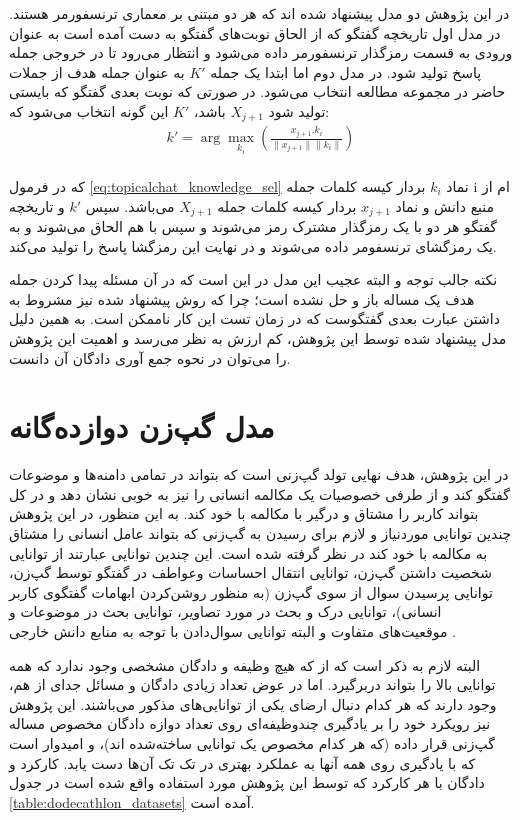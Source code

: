 در این پژوهش دو مدل پیشنهاد شده اند که هر دو مبتنی بر معماری ترنسفورمر هستند. در مدل اول تاریخچه گفتگو که از الحاق نوبت‌های گفتگو به دست آمده است به عنوان ورودی به قسمت رمزگذار ترنسفورمر داده می‌شود و انتظار می‌رود تا در خروجی جمله پاسخ تولید شود.
در مدل دوم اما ابتدا یک جمله 
$K'$ 
به عنوان جمله هدف از جملات حاضر در مجموعه مطالعه انتخاب می‌شود. در صورتی که نوبت‌ بعدی گفتگو که بایستی تولید شود 
$X_{j+1}$
باشد، 
$K'$
این گونه انتخاب می‌شود که:
\\
\begin{gather} \label{eq:topicalchat_knowledge_sel}
k' = \arg\max_{k_i}{
(\frac{x_{j+1}.k_i}{\lVert  x_{j+1}  \rVert 
	\lVert  k_i  \rVert})
}
\end{gather}
\\
که در فرمول 
\ref{eq:topicalchat_knowledge_sel}
نماد‌
$k_i$
بردار کیسه کلمات جمله i ام از منبع دانش و نماد
$x_{j+1}$
بردار کیسه کلمات جمله 
$X_{j+1}$
می‌باشد.
سپس 
$k'$
و تاریخچه گفتگو هر دو با یک رمزگذار مشترک رمز می‌شوند و سپس با هم الحاق می‌شوند و به یک رمز‌گشای ترنسفومر داده می‌شوند و در نهایت این رمزگشا پاسخ را تولید می‌کند. 

نکته جالب توجه و البته عجیب این مدل در این است که در آن مسئله پیدا کردن جمله هدف یک مساله باز و حل نشده است؛ چرا که روش پیشنهاد شده نیز مشروط به داشتن عبارت بعدی گفتگوست که در زمان تست این کار ناممکن است. به همین دلیل مدل پیشنهاد شده توسط این پژوهش، کم ارزش به نظر می‌رسد و اهمیت این پژوهش را می‌توان در نحوه جمع آوری دادگان آن دانست.


\section{مدل گپ‌زن دوازده‌گانه}
در این پژوهش، هدف نهایی تولد گپ‌زنی است که بتواند در تمامی دامنه‌ها و موضوعات گفتگو کند و از طرفی خصوصیات یک مکالمه انسانی را نیز به خوبی نشان دهد و در کل بتواند کاربر را مشتاق و درگیر با مکالمه با خود کند. به این منظور، ‌در این پژوهش چندین توانایی موردنیاز و لازم برای رسیدن به گپ‌زنی که بتواند عامل انسانی را مشتاق به مکالمه با خود کند در نظر گرفته شده است. این چندین توانایی عبارتند از توانایی شخصیت داشتن گپ‌زن، توانایی انتقال احساسات وعواطف  در گفتگو توسط گپ‌زن، توانایی پرسیدن سوال از سوی گپ‌زن (به منظور روشن‌کردن ابهامات گفتگوی کاربر انسانی)، توانایی درک و بحث در مورد تصاویر، توانایی بحث در موضوعات و موقعیت‌های متفاوت و البته توانایی سوال‌دادن با توجه به منابع دانش خارجی
\cite{dodecathlon_paper}.

البته لازم به ذکر است که از که هیچ وظیفه و دادگان مشخصی وجود ندارد که همه توانایی بالا را بتواند دربرگیرد. اما در عوض تعداد زیادی دادگان و مسائل جدای از هم، ‌وجود دارند که هر کدام دنبال ارضای یکی از توانایی‌های مذکور می‌باشند. این پژوهش نیز رویکرد خود را بر یادگیری چندوظیفه‌ای روی تعداد دوازه دادگان مخصوص مساله گپ‌زنی‌ قرار داده (که هر کدام مخصوص یک توانایی ساخته‌شده اند)، و امیدوار است که با یادگیری روی همه آنها به عملکرد بهتری در تک تک آن‌ها دست یابد. کارکرد و دادگان با هر کارکرد که توسط این پژوهش مورد استفاده واقع شده است در جدول 
\ref{table:dodecathlon_datasets}
آمده است.

